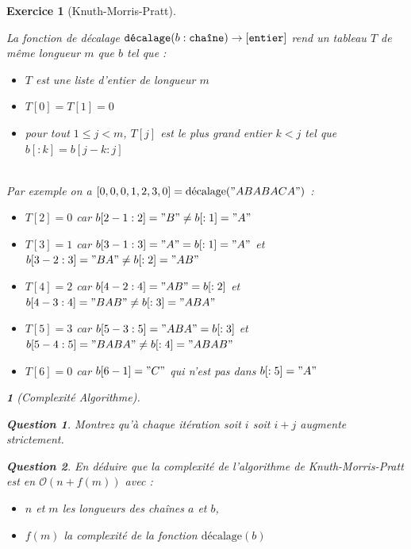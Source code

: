 \documentclass{article}
\theoremstyle{exostyle}
\newtheorem{exo}{Exercice}
\theoremstyle{partiestyle}
\newtheorem{partie}{}[exo]
\theoremstyle{questionstyle}
\newtheorem{questionpartie}{Question}[partie]
\begin{document}
\begin{exo}[Knuth-Morris-Pratt]
\begin{tabbing}
        \end{tabbing}
         La fonction de décalage $\texttt{décalage}(b: \text{\texttt{chaîne}})\rightarrow [\text{\texttt{entier}}]$ rend un tableau $T$ de même longueur $m$ que $b$ tel que :~\\
            \begin{itemize}
                \item $T$ est une liste d'entier de longueur $m$
                \item $T[0] = T[1] = 0$
                \item pour tout $1 \leq j < m$, $T[j]$ est le plus grand entier $k < j$ tel que $b[:k] = b[j-k:j]$
            \end{itemize}~\\
Par exemple on a $[0, 0, 0, 1, 2, 3, 0] = \text{décalage}("ABABACA")$ :~\\
            \begin{itemize}
                \item $T[2] = 0$ car $b[2-1:2] = "B" \neq b[:1] = "A"$
                \item $T[3] = 1$ car $b[3-1:3] ="A" = b[:1] = "A"$ et $b[3-2:3] ="BA" \neq b[:2] = "AB"$
                \item $T[4] = 2$ car $b[4-2:4] ="AB" = b[:2]$ et $b[4-3:4] ="BAB" \neq b[:3] = "ABA"$
                \item $T[5] = 3$ car $b[5-3:5] ="ABA" = b[:3]$ et $b[5-4:5] ="BABA" \neq b[:4] = "ABAB"$
                \item $T[6] = 0$ car $b[6-1] ="C"$ qui n'est pas dans $b[:5] = "A"$
            \end{itemize}
    \begin{partie}[Complexité Algorithme]
        \begin{questionpartie}
            Montrez qu'à chaque itération soit $i$ soit $i+j$ augmente strictement.
        \end{questionpartie}
        \begin{questionpartie}
            En déduire que la complexité de l'algorithme de Knuth-Morris-Pratt est en $\mathcal{O}(n + f(m))$ avec :
            \begin{itemize}
                \item $n$ et $m$ les longueurs des chaînes $a$ et $b$,
                \item $f(m)$ la complexité de la fonction $\text{décalage}(b)$
            \end{itemize}
        \end{questionpartie}
    \end{partie}
    

\end{exo}
\end{document}

